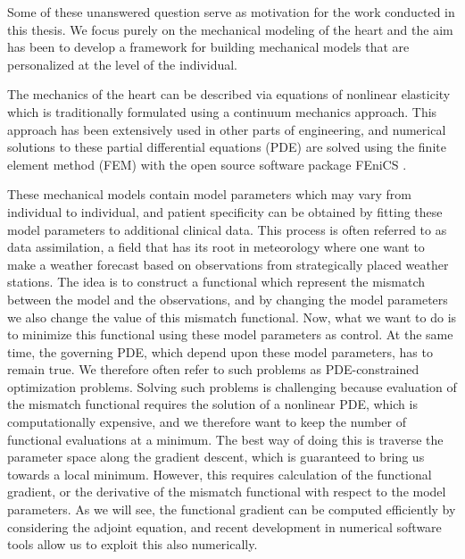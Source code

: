 
Some of these unanswered question serve as motivation for the work
conducted in this thesis. We focus purely on the mechanical modeling
of the heart and the aim has been to develop a framework for
building mechanical models that are personalized at the level of the
individual.

The mechanics of the heart can be described via equations of nonlinear
elasticity which is traditionally formulated using a continuum
mechanics approach. This approach has been extensively used in other
parts of engineering, and numerical solutions to these partial
differential equations (PDE) are solved using the finite element
method (FEM) with the open source software package FEniCS \cite{logg2012automated}.

These mechanical models contain model parameters which may vary from
individual to individual, and patient specificity can be obtained by
fitting these model parameters to additional clinical data. This
process is often referred to as data assimilation, a field that has
its root in meteorology where one want to make a weather forecast based
on observations from strategically placed weather stations. The idea
is to construct a functional which represent the mismatch between the
model and the observations, and by changing the model parameters we
also change the value of this mismatch functional. Now, what we want to do is to
minimize this functional using these model parameters as control. At
the same time, the governing PDE, which depend upon these model
parameters, has to remain true. We therefore often
refer to such problems as PDE-constrained optimization problems.  
Solving such problems is challenging because evaluation of the
mismatch functional requires the solution of a nonlinear PDE, which is
computationally expensive, and we therefore want to keep the number of
functional evaluations at a minimum. The best way of doing this is
traverse the parameter space along the gradient descent, which is
guaranteed to bring us towards a local minimum. However, this requires
calculation of the functional gradient, or the derivative of the
mismatch functional with respect to the model parameters. As we will
see, the functional gradient can be computed efficiently by
considering the adjoint equation, and recent development in numerical
software tools \cite{farrell2013automated} allow us to exploit this
also numerically. 


